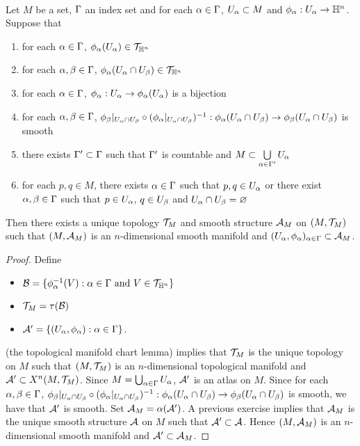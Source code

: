 \documentclass{book}
\begin{document}
		
	\begin{ex}   \\
		Let $M$ be a set, $\Gamma$ an index set and for each $\alpha \in \Gamma$, $U_{\alpha} \subset M$ and $\phi_{\alpha}: U_{\alpha} \rightarrow \mathbb{H}^n$. Suppose that 
		\begin{enumerate}[label=(\alph*)]
			\item for each $\alpha \in \Gamma$, $\phi_{\alpha}(U_{\alpha}) \in \mathcal{T}_{\mathbb{H}^n}$
			\item for each $\alpha, \beta \in \Gamma$, $\phi_{\alpha}(U_{\alpha} \cap U_{\beta}) \in \mathcal{T}_{\mathbb{H}^n}$
			\item for each $\alpha \in \Gamma$, $\phi_{\alpha}: U_{\alpha} \rightarrow \phi_{\alpha}(U_{\alpha})$ is a bijection
			\item for each $\alpha, \beta \in \Gamma$, $\phi_{\beta}|_{U_{\alpha} \cap U_{\beta}} \circ (\phi_{\alpha}|_{U_{\alpha} \cap U_{\beta}})^{-1}: \phi_{\alpha}(U_{\alpha} \cap U_{\beta}) \rightarrow \phi_{\beta}(U_{\alpha} \cap U_{\beta})$ is smooth
			\item there exists $\Gamma' \subset \Gamma$ such that $\Gamma'$ is countable and $M \subset \bigcup\limits_{\alpha \in \Gamma'} U_{\alpha}$
			\item for each $p,q \in M$, there exists $\alpha \in \Gamma$ such that $p,q \in U_{\alpha}$ or there exist $\alpha,\beta \in \Gamma$ such that $p \in U_{\alpha}$, $q \in U_{\beta}$ and $U_{\alpha} \cap U_{\beta} = \varnothing$
		\end{enumerate}
		Then there exists a unique topology $\mathcal{T}_M$ and smooth structure $\mathcal{A}_M$ on $(M, \mathcal{T}_M)$ such that $(M, \mathcal{A}_M)$ is an $n$-dimensional smooth manifold and $(U_{\alpha}, \phi_{\alpha})_{\alpha \in \Gamma} \subset \mathcal{A}_M$.
	\end{ex}
	
	\begin{proof}
		Define
		\begin{itemize}
			\item $\mathcal{B} = \{\phi_{\alpha}^{-1}(V): \alpha \in \Gamma \text{ and } V \in \mathcal{T}_{\mathbb{H}^n}\}$ 
			\item $\mathcal{T}_M = \tau(\mathcal{B})$ 
			\item $\mathcal{A}' = \{(U_{\alpha}, \phi_{\alpha}) : \alpha \in \Gamma\}$.
		\end{itemize}
		 (the topological manifold chart lemma) implies that $\mathcal{T}_M$ is the unique topology on $M$ such that $(M, \mathcal{T}_M)$ is an $n$-dimensional topological manifold and $\mathcal{A}' \subset X^n(M, \mathcal{T}_M)$. Since $M = \bigcup_{\alpha \in \Gamma} U_{\alpha}$, $\mathcal{A}'$ is an atlas on $M$. Since for each $\alpha, \beta \in \Gamma$, $\phi_{\beta}|_{U_{\alpha} \cap U_{\beta}} \circ (\phi_{\alpha}|_{U_{\alpha} \cap U_{\beta}})^{-1}: \phi_{\alpha}(U_{\alpha} \cap U_{\beta}) \rightarrow \phi_{\beta}(U_{\alpha} \cap U_{\beta})$ is smooth, we have that $\mathcal{A}'$ is smooth. Set $\mathcal{A}_M = \alpha(\mathcal{A}')$. A previous exercise implies that $\mathcal{A}_M$ is the unique smooth structure $\mathcal{A}$ on $M$ such that $\mathcal{A}' \subset \mathcal{A}$. Hence $(M, \mathcal{A}_M)$ is an $n$-dimensional smooth manifold and $\mathcal{A}' \subset \mathcal{A}_M$. 
	\end{proof}
	
\end{document}
